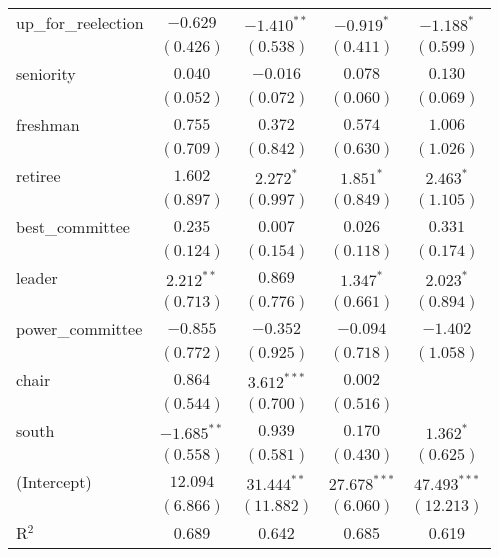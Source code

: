 \documentclass[12pt]{article}
\begin{document}
\begin{table}[H]
\begin{center}
\begin{tabular}{l c c c c }
			up\_for\_reelection           & $-0.629$      & $-1.410^{**}$ & $-0.919^{*}$   & $-1.188^{*}$   \\
			& $(0.426)$     & $(0.538)$     & $(0.411)$      & $(0.599)$      \\
			seniority                     & $0.040$       & $-0.016$      & $0.078$        & $0.130$        \\
			& $(0.052)$     & $(0.072)$     & $(0.060)$      & $(0.069)$      \\
			freshman                      & $0.755$       & $0.372$       & $0.574$        & $1.006$        \\
			& $(0.709)$     & $(0.842)$     & $(0.630)$      & $(1.026)$      \\
			retiree                       & $1.602$       & $2.272^{*}$   & $1.851^{*}$    & $2.463^{*}$    \\
			& $(0.897)$     & $(0.997)$     & $(0.849)$      & $(1.105)$      \\
			best\_committee               & $0.235$       & $0.007$       & $0.026$        & $0.331$        \\
			& $(0.124)$     & $(0.154)$     & $(0.118)$      & $(0.174)$      \\
			leader                        & $2.212^{**}$  & $0.869$       & $1.347^{*}$    & $2.023^{*}$    \\
			& $(0.713)$     & $(0.776)$     & $(0.661)$      & $(0.894)$      \\
			power\_committee              & $-0.855$      & $-0.352$      & $-0.094$       & $-1.402$       \\
			& $(0.772)$     & $(0.925)$     & $(0.718)$      & $(1.058)$      \\
			chair                         & $0.864$       & $3.612^{***}$ & $0.002$        &                \\
			& $(0.544)$     & $(0.700)$     & $(0.516)$      &                \\
			south                         & $-1.685^{**}$ & $0.939$       & $0.170$        & $1.362^{*}$    \\
			& $(0.558)$     & $(0.581)$     & $(0.430)$      & $(0.625)$      \\
			(Intercept)                   & $12.094$      & $31.444^{**}$ & $27.678^{***}$ & $47.493^{***}$ \\
			& $(6.866)$     & $(11.882)$    & $(6.060)$      & $(12.213)$     \\
			\hline
			R$^2$                         & 0.689         & 0.642         & 0.685          & 0.619          \\

\end{tabular}
\end{center}
\end{table}
\end{document}
